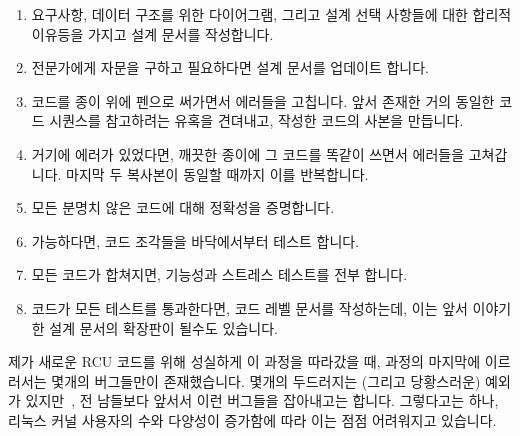 \begin{enumerate}
\item	요구사항, 데이터 구조를 위한 다이어그램, 그리고 설계 선택 사항들에 대한
	합리적 이유등을 가지고 설계 문서를 작성합니다.
\item	전문가에게 자문을 구하고 필요하다면 설계 문서를 업데이트 합니다.
\item	코드를 종이 위에 펜으로 써가면서 에러들을 고칩니다.
	앞서 존재한 거의 동일한 코드 시퀀스를 참고하려는 유혹을 견뎌내고,
	작성한 코드의 사본을 만듭니다.
\item	거기에 에러가 있었다면, 깨끗한 종이에 그 코드를 똑같이 쓰면서 에러들을
	고쳐갑니다.
	마지막 두 복사본이 동일할 때까지 이를 반복합니다.
\item	모든 분명치 않은 코드에 대해 정확성을 증명합니다.
\item	가능하다면, 코드 조각들을 바닥에서부터 테스트 합니다.
\item	모든 코드가 합쳐지면, 기능성과 스트레스 테스트를 전부 합니다.
\item	코드가 모든 테스트를 통과한다면, 코드 레벨 문서를 작성하는데, 이는 앞서
	이야기한 설계 문서의 확장판이 될수도 있습니다.

\end{enumerate}

제가 새로운 RCU 코드를 위해 성실하게 이 과정을 따라갔을 때, 과정의 마지막에
이르러서는 몇개의 버그들만이 존재했습니다.
몇개의 두드러지는 (그리고 당황스러운) 예외가
있지만~\cite{PaulEMcKenney2011RCU3.0trainwreck}, 전 남들보다 앞서서 이런
버그들을 잡아내고는 합니다.
그렇다고는 하나, 리눅스 커널 사용자의 수와 다양성이 증가함에 따라 이는 점점
어려워지고 있습니다.
\iffalse

